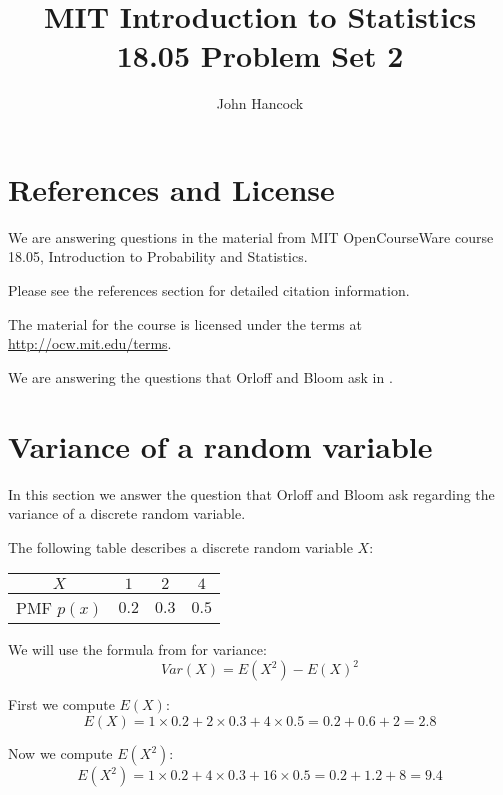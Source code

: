 \documentclass[a4paper,11pt]{article}
\author{John Hancock}
\title{MIT Introduction to Statistics 18.05 Problem Set 2 }
\begin{document}
\maketitle
\tableofcontents
\section{References and License}
We are answering questions in the material from MIT OpenCourseWare
course 18.05, Introduction to Probability and Statistics.

Please see the references section for detailed citation information.

The material for the course is licensed under the terms at
\url{http://ocw.mit.edu/terms}.

We are answering the questions that Orloff and Bloom ask in
\cite{reading5aQuestions}.

\section{Variance of a random variable}
In this section we answer the question that Orloff and Bloom ask regarding
the variance of a discrete random variable.

The following table describes a discrete random variable $X$:

\begin{center}
\begin{tabular}{ | c | c | c | c|}
    \hline
    $X$ & $1$ & $2$ & $4$ \\ \hline
		PMF $p \left(x \right)$ & $0.2$ & $0.3$ & $0.5$ \\ \hline
\end{tabular}
\end{center}

We will use the formula from \cite{reading5a} for variance:
\begin{equation}\label{varFormula}
	Var \left( X \right) = E \left( X^{2} \right) - E \left( X\right)^{2}
\end{equation}

First we compute $E \left( X \right)$:
\begin{equation}
  E \left( X \right) = 1 \times 0.2 + 2 \times 0.3 + 4 \times 0.5
    = 0.2 + 0.6 + 2 = 2.8
\end{equation}

Now we compute $E \left( X^{2} \right)$:
\begin{equation}
  E \left( X^{2} \right)
    = 1 \times 0.2 + 4 \times 0.3 + 16 \times 0.5
    = 0.2 + 1.2 + 8
    = 9.4
\end{equation}
\end{document}
